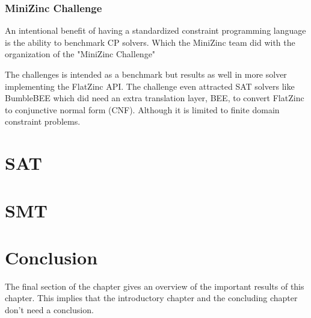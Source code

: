 \subsubsection{MiniZinc Challenge}
An intentional benefit of having a standardized constraint programming language is the ability to benchmark CP solvers. Which the MiniZinc team did with the organization of the "MiniZinc Challenge"

The challenges is intended as a benchmark but results as well in more solver implementing the FlatZinc API. The challenge even attracted SAT solvers like BumbleBEE \cite{69BEEmetodi2012compiling} which did need an extra translation layer, BEE, to convert FlatZinc to conjunctive normal form (CNF). Although it is limited to finite domain constraint problems.

\section{SAT}
\label{CS:SAT}


\section{SMT}
\label{CS:SMT}


\section{Conclusion}
\label{CS:conclusion}
The final section of the chapter gives an overview of the important results
of this chapter. This implies that the introductory chapter and the
concluding chapter don't need a conclusion.

